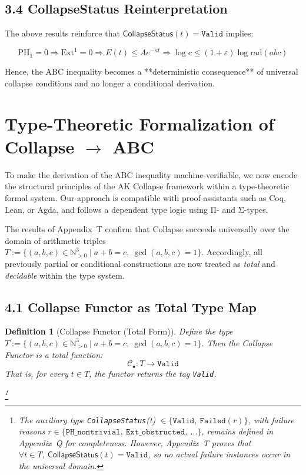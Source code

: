 \documentclass[11pt]{article}
\newtheorem{definition}[theorem]{Definition}
\begin{document}
\subsection{3.4 CollapseStatus Reinterpretation}

The above results reinforce that \( \mathsf{CollapseStatus}(t) = \texttt{Valid} \) implies:

\[
\mathrm{PH}_1 = 0 \Rightarrow \mathrm{Ext}^1 = 0 \Rightarrow E(t) \leq A e^{-\kappa t} \Rightarrow \log c \leq (1+\varepsilon) \log \mathrm{rad}(abc)
\]

Hence, the ABC inequality becomes a **deterministic consequence** of universal collapse conditions and no longer a conditional derivation.




\section{Type-Theoretic Formalization of Collapse \texorpdfstring{$\to$}{→} ABC}

To make the derivation of the ABC inequality machine-verifiable, we now encode the structural principles of the AK Collapse framework within a type-theoretic formal system. Our approach is compatible with proof assistants such as Coq, Lean, or Agda, and follows a dependent type logic using Π- and Σ-types.

The results of Appendix~T confirm that Collapse succeeds universally over the domain of arithmetic triples \( T := \{ (a,b,c) \in \mathbb{N}_{>0}^3 \mid a + b = c,\ \gcd(a,b,c) = 1 \} \).  
Accordingly, all previously partial or conditional constructions are now treated as \emph{total} and \emph{decidable} within the type system.

\subsection{4.1 Collapse Functor as Total Type Map}

\begin{definition}[Collapse Functor (Total Form)]
Define the type \( T := \{ (a,b,c) \in \mathbb{N}_{>0}^3 \mid a + b = c,\ \gcd(a,b,c) = 1 \} \).  
Then the \emph{Collapse Functor} is a total function:
\[
\mathcal{C}_\bullet : T \longrightarrow \texttt{Valid}
\]
That is, for every \( t \in T \), the functor returns the tag \texttt{Valid}.

\footnote{
The auxiliary type \texttt{CollapseStatus}(t) \(\in \{ \texttt{Valid},\ \texttt{Failed}(r) \}\),  
with failure reasons \( r \in \{\texttt{PH\_nontrivial},\ \texttt{Ext\_obstructed},\ \ldots \} \), remains defined in Appendix~Q for completeness.  
However, Appendix~T proves that \( \forall t \in T,\ \mathsf{CollapseStatus}(t) = \texttt{Valid} \),  
so no actual failure instances occur in the universal domain.
}
\end{definition}
\end{document}
